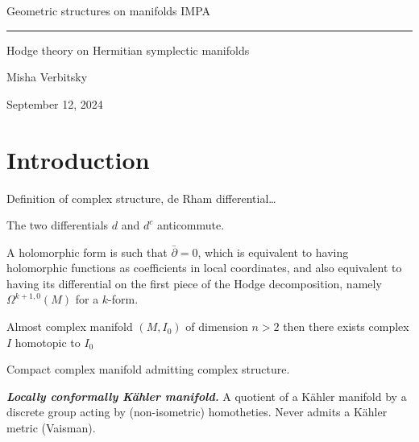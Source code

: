 



\begin{minipage}{\textwidth}
	\begin{minipage}{1\textwidth}
		Geometric structures on manifolds \hfill IMPA
		
	\end{minipage}
\end{minipage}\vspace{.2cm}\hrule

\vspace{10pt}

{\Huge Hodge theory on Hermitian symplectic manifolds}

\hfill{\Large Misha Verbitsky}

\hfill{\large September 12, 2024}

\tableofcontents

\section{Introduction}

Definition of complex structure, de Rham differential…

\begin{remark}
The two differentials $d$ and $d^c$ anticommute.
\end{remark}

\begin{remark}
	A holomorphic form is such that $ \bar{\partial} =0$, which is equivalent to having holomorphic functions as coefficients in local coordinates, and also equivalent to having its differential on the first piece of the Hodge decomposition, namely $\Omega^{k+1,0}(M)$ for a $k$-form.
\end{remark}

\begin{conjecture} 
	Almost complex manifold $(M,I_0)$ of dimension $n>2$ then there exists complex $I$ homotopic to $I_0$
\end{conjecture}

\begin{defn}
	Compact complex manifold admitting complex structure.

	\textit{\textbf{Locally conformally K\"ahler manifold.}} A quotient of a K\"ahler manifold by a discrete group acting by (non-isometric) homotheties. Never admits a K\"ahler metric (Vaisman).
\end{defn}

